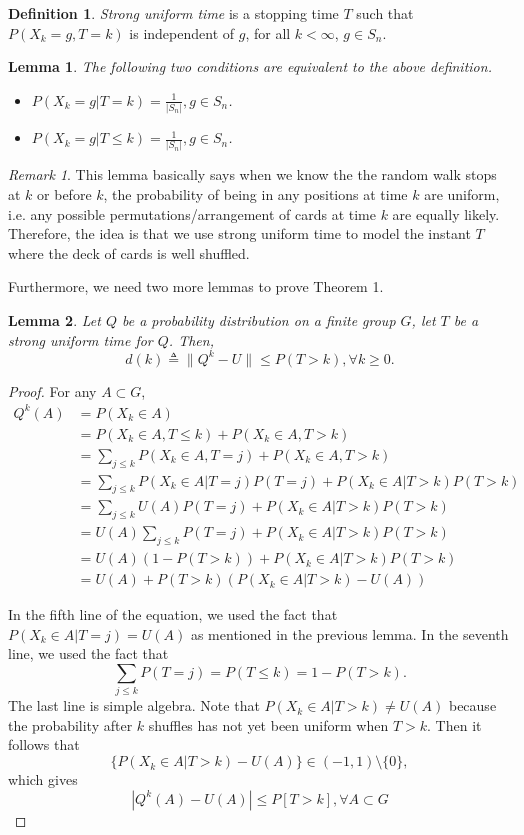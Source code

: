 \documentclass[12pt]{article}
\theoremstyle{plain}
\newtheorem{lemma}{Lemma}
\theoremstyle{definition}
\newtheorem{definition}{Definition}
\theoremstyle{remark}
\newtheorem*{remark}{Remark}
\begin{document}
\begin{definition}  
\textit{Strong uniform time} is a stopping time $T$ such that $P(X_k=g,T=k)$ is independent of $g$, for all $k<\infty$, $g\in S_n$. 
\end{definition}

\begin{lemma}\cite[Remark~(i) on \pno~336]{1.1}
The following two conditions are equivalent to the above definition. 
\begin{itemize}
    \item $P(X_k=g|T=k)=\frac{1}{|S_n|},g\in S_n$.
    \item $P(X_k=g|T\leq k)=\frac{1}{|S_n|},g\in S_n$.
\end{itemize}
\end{lemma}

\begin{remark}
This lemma basically says when we know the the random walk stops at $k$ or before $k$, the probability of being in any positions at time $k$ are uniform, i.e. any possible permutations/arrangement of cards at time $k$ are equally likely. Therefore, the idea is that we use strong uniform time to model the instant $T$ where the deck of cards is well shuffled. 
\end{remark}
Furthermore, we need two more lemmas to prove Theorem 1.

\begin{lemma}\cite[Lemma~1 on \pno~336]{1.1}
Let $Q$ be a probability distribution on a finite group $G$, let $T$ be a strong uniform time for $Q$. Then, $$d(k)\triangleq \|Q^k-U\|\leq P(T>k),\forall k \geq 0.$$
\end{lemma} 

\begin{proof}
For any $A\subset G$,
\begin{equation*}
\begin{split}
Q^k(A)&=P(X_k\in A)\\
&=P(X_k\in A,T\leq k)+P(X_k\in A,T>k)\\
&=\sum_{j\leq k} P(X_k\in A,T=j)+P(X_k\in A,T>k)\\
&=\sum_{j\leq k} P(X_k\in A|T=j)P(T=j)+P(X_k\in A|T>k)P(T>k)\\
&=\sum_{j\leq k} U(A)P(T=j)+P(X_k\in A|T>k)P(T>k)\\
&=U(A)\sum_{j\leq k} P(T=j)+P(X_k\in A|T>k)P(T>k)\\
&=U(A)(1-P(T>k))+P(X_k\in A|T>k)P(T>k)\\
&=U(A)+P(T>k)(P(X_k\in A|T>k)-U(A))
\end{split}
\end{equation*}

In the fifth line of the equation, we used the fact that $P(X_k\in A|T=j)=U(A)$ as mentioned in the previous lemma. In the seventh line, we used the fact that $$\sum_{j\leq k}P(T=j)=P(T\leq k)=1-P(T> k).$$ The last line is simple algebra. Note that $P(X_k\in A|T>k)\neq U(A)$ because the probability after $k$ shuffles has not yet been uniform when $T>k$. Then it follows that $$\{P(X_k\in A|T>k)-U(A)\}\in (-1,1)\setminus \{0\},$$
which gives $$|Q^k(A)-U(A)|\leq P[T>k], \forall A\subset G$$
\end{proof}
\end{document}
